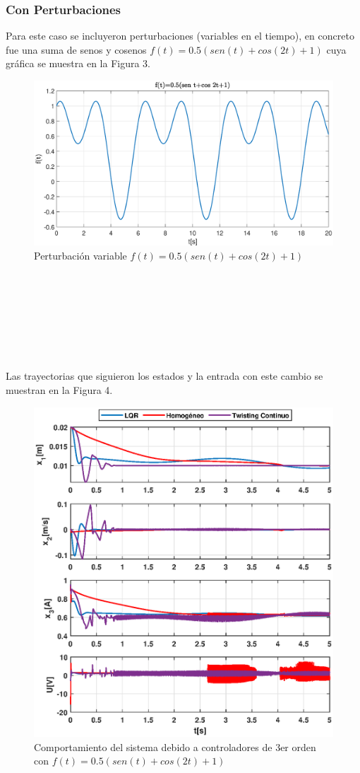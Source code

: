 \documentclass[onecolumn,10pt]{article}
\begin{document}
\subsubsection*{Con Perturbaciones}
Para este caso se incluyeron perturbaciones (variables en el tiempo), en concreto fue una suma de senos y cosenos $f(t)=0.5(sen(t)+cos(2t)+1)$ cuya gr\'afica se muestra en la Figura 3. 
\begin{figure}[!h]
\centering
\includegraphics[scale=0.26]{pv.eps}
\caption{Perturbaci\'on variable $f(t)=0.5(sen(t)+cos(2t)+1)$}
\end{figure}
\\
\\
\\
\\
\\
\\
\\
Las trayectorias que siguieron los estados y la entrada con este cambio se muestran en la Figura 4.
\begin{figure}[!h]
\centering
\includegraphics[scale=0.55]{xu_3o_c3o_pv.eps}
\caption{Comportamiento del sistema debido a controladores de 3er orden con $f(t)=0.5(sen(t)+cos(2t)+1)$}
\end{figure}
\end{document}
